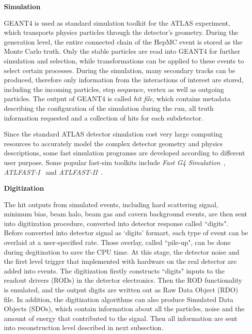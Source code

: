 \textbf{Simulation}

GEANT4 is used as standard simulation toolkit for the ATLAS experiment, which transports physics particles through the detector's geometry.
During the generation level, the entire connected chain of the HepMC event is stored as the Monte Carlo truth. 
Only the stable particles are read into GEANT4 for further simulation and selection, while transformations can be applied to these events to select certain processes.
During the simulation, many secondary tracks can be produced, therefore only information from the interactions of interest are stored, including the incoming particles, step sequence, vertex as well as outgoing particles.
The output of GEANT4 is called \textit{hit file}, which contains metadata describing the configuration of the simulation during the run, all truth information requested and a collection of hits for each subdetector.

Since the standard ATLAS detector simulation cost very large computing resources to accurately model the complex detector geometry and physics descriptions, some fast simulation programss are developed according to different user purpose.
Some popular fast-sim toolkits include \textit{Fast G4 Simulation}~\cite{Barberio:2007gba}, \textit{ATLFAST-I}~\cite{Richter-Was:683751} and \textit{ATLFAST-II}~\cite{Edmonds:1091969}.

\textbf{Digitization}

The hit outputs from simulated events, including hard scattering signal, minimum bias, beam halo, beam gas and cavern background events, are then sent into digitization procedure, converted into detector response called ``digits".
Before converted into detector signal as `digits' formart, each type of event can be overlaid at a user-specified rate.
Those overlay, called ``pile-up", can be done during degitization to save the CPU time.
At this stage, the detector noise and the first level trigger that implemented with hardware on the real detector are added into events.
The digitization firstly constructs ``digits" inputs to the readout drivers (RODs) in the detector electronics.
Then the ROD functionality is emulated, and the output digits are written out as Raw Data Object (RDO) file.
In addition, the digitization algorithms can also produce Simulated Data Objects (SDOs), which contain information about all the particles, noise and the amount of energy that contributed to the signal. 
Then all information are sent into reconstruction level described in next subsection.
